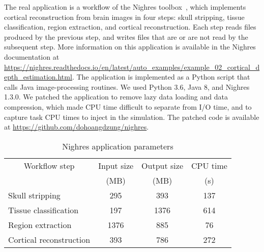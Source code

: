 \documentclass[conference]{IEEEtran}
\begin{document}
        The real application is a workflow of the Nighres
        toolbox~\cite{huntenburg2018nighres}, which implements cortical
        reconstruction from brain images in four steps: skull stripping,
        tissue classification, region extraction, and cortical
        reconstruction. Each step reads files produced by the previous step,
        and writes files that are or are not read by the subsequent step.
        More information on this application is available in the Nighres
        documentation at
        \url{https://nighres.readthedocs.io/en/latest/auto_examples/example_02_cortical_depth_estimation.html}.
        The application is implemented as a Python script that calls Java
        image-processing routines. We used Python 3.6, Java 8, and Nighres
        1.3.0. We patched the application to remove lazy data loading and
        data compression, which made CPU time difficult to separate from
        I/O time, and to capture task CPU times to inject in the
        simulation. The patched code is available at
        \url{https://github.com/dohoangdzung/nighres}.
        \begin{table}[t]
            \centering
            \begin{tabular}{lccc}
            \toprule
                \multicolumn{1}{c}{Workflow step}& Input size       & Output size      & CPU time\\
                                       & (MB)             & (MB)             & (s)\\
            \midrule
               Skull stripping         &  295             & 393               & 137 \\
               Tissue classification   &  197              & 1376              & 614 \\
               Region extraction       &  1376             & 885              & 76 \\
               Cortical reconstruction &  393              & 786              & 272\\
            \bottomrule
            \end{tabular} 
            \caption{Nighres application parameters}
            \label{table:nighres_stats}
            \end{table}
\end{document}
